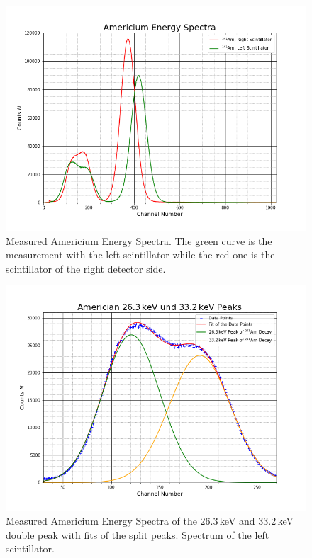 \documentclass[30pt,a4paper]{article}
\begin{document}
	\begin{figure}[h]
		\includegraphics[scale=0.5]{Bilder/Americium_Energy_Spectra}
		\centering
		\caption[Americium Spectra]{Measured Americium Energy Spectra. The green curve is the measurement with the left scintillator while the red one is the scintillator of the right detector side.}
		\label{AS}
	\end{figure}
	\begin{figure}[h]
		\includegraphics[scale=0.5]{Bilder/kleine_Peaks2}
		\centering
		\caption[Americium Spectra Double Peak Left Detector Side]{Measured Americium Energy Spectra of the $26.3$\,keV and $33.2$\,keV double peak with fits of the split peaks. Spectrum of the left scintillator.}
		\label{ASL}
	\end{figure}
\end{document}
